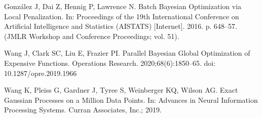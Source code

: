 \documentclass{IOS-Book-Article}
\begin{document}
\begin{thebibliography}{99}
		González J, Dai Z, Hennig P, Lawrence N. Batch Bayesian Optimization via Local Penalization. In: Proceedings of the 19th International Conference on Artificial Intelligence and Statistics (AISTATS) [Internet]. 2016. p. 648–57. (JMLR Workshop and Conference Proceedings; vol. 51).
		
		
		Wang J, Clark SC, Liu E, Frazier PI. Parallel Bayesian Global Optimization of Expensive Functions. Operations Research. 2020;68(6):1850–65. doi: 10.1287/opre.2019.1966
		
		Wang K, Pleiss G, Gardner J, Tyree S, Weinberger KQ, Wilson AG. Exact Gaussian Processes on a Million Data Points. In: Advances in Neural Information Processing Systems. Curran Associates, Inc.; 2019.
		
		
	\end{thebibliography}
	
\end{document}
